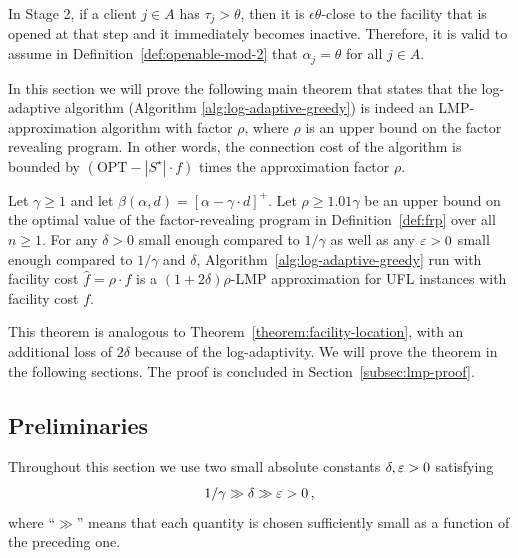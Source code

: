 \begin{remark}
In Stage 2, if a client $j \in A$ has $\tau_j > \theta$, then it is $\epsilon \theta$-close to the facility that is opened at that step and it immediately becomes inactive.
Therefore, it is valid to assume in Definition~\ref{def:openable-mod-2} that $\alpha_j = \theta$ for all $j \in A$.
\end{remark}
In this section we will prove the following main theorem that states that the log-adaptive algorithm (Algorithm \ref{alg:log-adaptive-greedy}) is indeed an LMP-approximation algorithm with factor $\rho$, where $\rho$ is an upper bound on the factor revealing program. In other words, the connection cost of the algorithm is bounded by $(\mathrm{OPT} - |S^\star| \cdot f)$ times the approximation factor $\rho$.
\begin{theorem}
\label{theorem:alg-lmp}
    Let $\gamma \geq 1$ and let $\beta(\alpha,d) = [\alpha - \gamma \cdot d]^+$. Let $\rho \geq 1.01 \gamma$ be an upper bound on the optimal value of the factor-revealing program in Definition~\ref{def:frp} over all $n \geq 1$.
    For any $\delta > 0$ small enough compared to $1/\gamma$ as well as any $\varepsilon > 0$ small enough compared to $1/\gamma$ and $\delta$,
    Algorithm~\ref{alg:log-adaptive-greedy} run with facility cost $\hat{f} = \rho \cdot f$ is a $(1+2\delta)\rho$-LMP approximation for UFL instances with facility cost $f$.
\end{theorem}
This theorem is analogous to Theorem~\ref{theorem:facility-location}, with an additional loss of $2\delta$ because of the log-adaptivity.
We will prove the theorem in the following sections. The proof is concluded in Section~\ref{subsec:lmp-proof}.

\subsection{Preliminaries}
Throughout this section we use two small absolute constants $\delta,\varepsilon > 0$ satisfying
\[
    1/\gamma \gg \delta \gg \varepsilon > 0\,,
\]
where ``$\gg$'' means that each quantity is chosen sufficiently small as a function of the preceding one.


